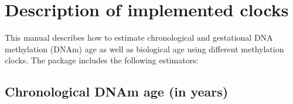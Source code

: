 \documentclass[]{article}
\subtitle{Gerardo Alfonso, Dolors Pelegri and Juan R Gonzalez}
\author{Institute for Global Health (ISGlobal), Barcelona, Spain
Bioinformatics Research Group in Epidemiolgy (BRGE)
http://brge.isglobal.org
}
\date{2020-01-15}
\begin{document}
\maketitle


{
\setcounter{tocdepth}{2}
\tableofcontents
\newpage
}
\hypertarget{description-of-implemented-clocks}{%
\section{Description of implemented clocks}\label{description-of-implemented-clocks}}

This manual describes how to estimate chronological and gestational DNA methylation (DNAm) age as well as biological age using different methylation clocks. The package includes the following estimators:

\hypertarget{chronological-dnam-age-in-years}{%
\subsection{Chronological DNAm age (in years)}\label{chronological-dnam-age-in-years}}
\end{document}
